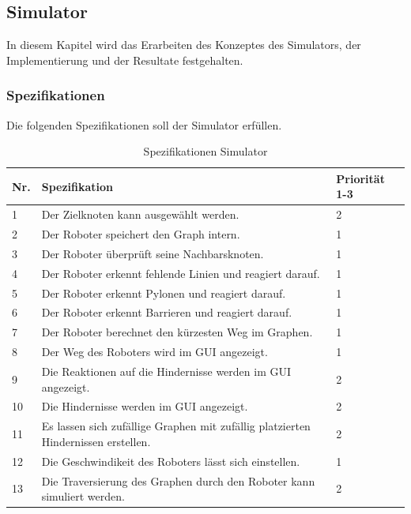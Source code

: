 \subsection{Simulator}

In diesem Kapitel wird das Erarbeiten des Konzeptes des Simulators, der Implementierung und der Resultate festgehalten.


\subsubsection{Spezifikationen}

Die folgenden Spezifikationen soll der Simulator erfüllen.

\begin{table}[H]
\centering
\small
\begin{tabularx}{\textwidth}{|l|X|l|}
\hline
  \textbf{Nr.} & \textbf{Spezifikation} & \textbf{Priorität 1-3}  \\
  \hline
  1  & Der Zielknoten kann ausgewählt werden. &  2\\
  \hline
   2   & Der Roboter speichert den Graph intern.  & 1\\
  \hline
   3 & Der Roboter überprüft seine Nachbarsknoten.&1\\
  \hline
  4 & Der Roboter erkennt fehlende Linien und reagiert darauf. & 1\\
  \hline
  5 &   Der Roboter erkennt Pylonen und reagiert darauf. & 1\\
  \hline
   6  &   Der Roboter erkennt Barrieren und reagiert darauf. & 1\\
  \hline
    7 &   Der Roboter berechnet den kürzesten Weg im Graphen.& 1\\
  \hline
     8  &   Der Weg des Roboters wird im GUI angezeigt. & 1\\
  \hline
      9   &   Die Reaktionen auf die Hindernisse werden im GUI angezeigt. & 2\\
  \hline
 10   &   Die Hindernisse werden im GUI angezeigt. & 2\\
  \hline
   11   &   Es lassen sich zufällige Graphen mit zufällig platzierten Hindernissen erstellen. & 2\\
  \hline
   12   &   Die Geschwindikeit des Roboters lässt sich einstellen. & 1\\
  \hline
   13   &   Die Traversierung des Graphen durch den Roboter kann simuliert werden. & 2\\
  \hline

\end{tabularx}
\caption{Spezifikationen Simulator}
\label{table:spezifikation-simulator}
\end{table}

